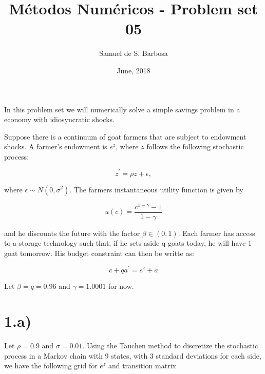 \documentclass{article}
\title{Métodos Numéricos - Problem set 05}
\author{Samuel de S. Barbosa}
\date{June, 2018}
\begin{document}
\maketitle

In this problem set we will numerically solve a simple savings problem in a
economy with idiosyncratic shocks.

Suppose there is a continuum of goat farmers that are subject to endowment
shocks. A farmer's endowment is $e^z$, where $z$ follows the following
stochastic process:

$$z^\prime = \rho z + \epsilon,$$

where $\epsilon \sim N(0,\sigma^2)$. The farmers instantaneous utility
function is given by

$$u(c) = \frac{c^{1-\gamma}-1}{1-\gamma}$$

and he discounts the future with the factor $\beta \in (0,1)$. Each farmer has
access to a storage technology such that, if he sets aside q goats today, he
will have 1 goat tomorrow. His budget constraint can then be writte as:

$$c + qa^\prime = e^z + a$$

Let $\beta = q = 0.96$ and $\gamma = 1.0001$ for now.

\section*{1.a)}

Let $\rho = 0.9$ and $\sigma = 0.01$. Using the Tauchen method to discretize the
stochastic process in a Markov chain with 9 states, with 3 standard deviations
for each side, we have the following grid for $e^z$ and transition matrix
\end{document}
